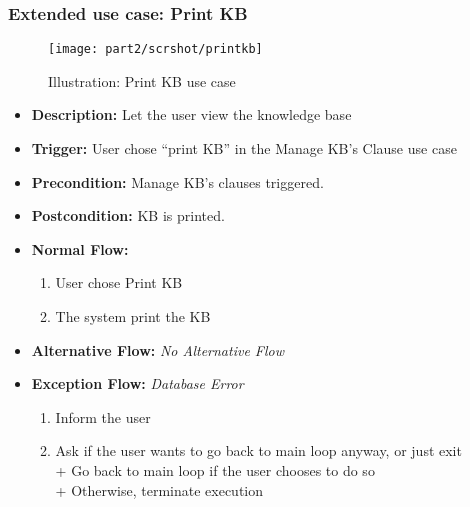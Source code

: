 \documentclass[../gr-final.tex]{subfiles}
\begin{document}
\subsubsection{Extended use case: Print KB}
\begin{figure}[H]
  \centering
  \texttt{[image: part2/scrshot/printkb]}
  \caption{Illustration: Print KB use case}
\end{figure}
\begin{itemize}
  \item {\bfseries Description:} Let the user view the knowledge
    base
  \item {\bfseries Trigger:} User chose ``print KB'' in the
    Manage KB's Clause use case
  \item {\bfseries Precondition:} Manage KB's clauses triggered.    
  \item {\bfseries Postcondition:} KB is printed.
  \item {\bfseries Normal Flow:}
    \begin{enumerate}
      \item User chose Print KB
      \item The system print the KB
    \end{enumerate}
  \item {\bfseries Alternative Flow:} {\em No Alternative Flow}
  \item {\bfseries Exception Flow:} 
    {\em Database Error}
    \begin{enumerate}
      \item Inform the user
      \item Ask if the user wants to go back to main loop anyway,
        or just exit\\
        \indent + Go back to main loop if the user chooses to do
        so\\
        \indent + Otherwise, terminate execution
    \end{enumerate}
\end{itemize}

\end{document}
